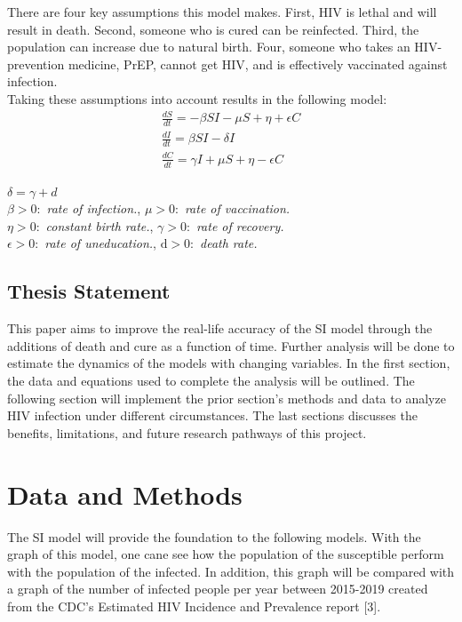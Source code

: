 \documentclass[a4paper, final, 12pt]{article}
\numberwithin{equation}{section}
\renewcommand{\d}{\mathrm{d}}
\begin{document}
There are four key assumptions this model makes. First, HIV is lethal and will result in death. Second, someone who is cured can be reinfected. Third, the population can increase due to natural birth. Four, someone who takes an HIV-prevention medicine, PrEP, cannot get HIV, and is effectively vaccinated against infection. \\
Taking these assumptions into account results in the following model: 
\begin{align}
    \frac{dS}{dt} = -\beta SI - \mu S + \eta + \epsilon C \\
    \frac{dI}{dt} = \beta SI - \delta I \\
    \frac{dC}{dt} = \gamma I + \mu S + \eta - \epsilon C
\end{align}
\begin{center}
    \(\delta = \gamma + d \) \\
    \(\beta > 0: \) \textit{rate of infection.}, \(\mu > 0: \) \textit{rate of vaccination.} \\
    \(\eta > 0: \) \textit{constant birth rate.}, \(\gamma > 0: \) \textit{rate of recovery.} \\
    \(\epsilon > 0: \) \textit{rate of uneducation.}, \(\d > 0: \) \textit{death rate.}\\
\end{center}

\subsection{Thesis Statement}
\hspace{22pt} This paper aims to improve the real-life accuracy of the SI model through the additions of death and cure as a function of time. Further analysis will be done to estimate the dynamics of the models with changing variables. In the first section, the data and equations used to complete the analysis will be outlined. The following section will implement the prior section's methods and data to analyze HIV infection under different circumstances. The last sections discusses the benefits, limitations, and future research pathways of this project. 

\section{Data and Methods}
\hspace{22pt} The SI model will provide the foundation to the following models. With the graph of this model, one cane see how the population of the susceptible perform with the population of the infected. In addition, this graph will be compared with a graph of the number of infected people per year between 2015-2019 created from the CDC's Estimated HIV Incidence and Prevalence report [3].\\
\end{document}
